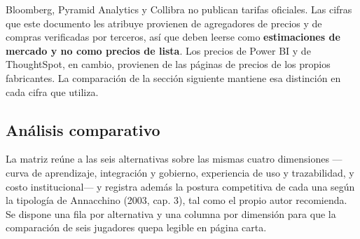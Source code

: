 \begin{uxnota}
Bloomberg, Pyramid Analytics y Collibra no publican tarifas oficiales. Las cifras que este documento les atribuye provienen de agregadores de precios y de compras verificadas por terceros, así que deben leerse como \textbf{estimaciones de mercado y no como precios de lista}. Los precios de Power BI y de ThoughtSpot, en cambio, provienen de las páginas de precios de los propios fabricantes. La comparación de la sección siguiente mantiene esa distinción en cada cifra que utiliza.
\end{uxnota}

\subsection{Análisis comparativo}

La matriz reúne a las seis alternativas sobre las mismas cuatro dimensiones —curva de aprendizaje, integración y gobierno, experiencia de uso y trazabilidad, y costo institucional— y registra además la postura competitiva de cada una según la tipología de Annacchino (2003, cap. 3), tal como el propio autor recomienda. Se dispone una fila por alternativa y una columna por dimensión para que la comparación de seis jugadores quepa legible en página carta.

